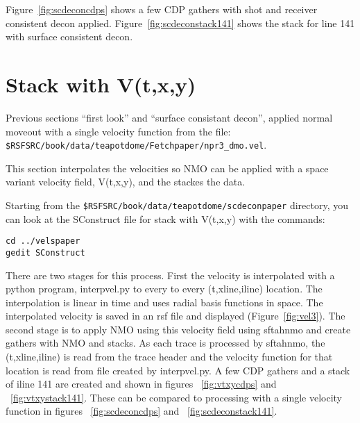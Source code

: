 Figure~\ref{fig:scdeconcdps} shows a few CDP gathers with shot and receiver consistent decon applied.  Figure~\ref{fig:scdeconstack141} shows the stack for line 141 with surface consistent decon.



\section{Stack with V(t,x,y)}

Previous sections ``first look'' and  ``surface consistant decon'', applied normal moveout  with a single velocity function from the file:
\texttt{\$RSFSRC/book/data/teapotdome/Fetchpaper/npr3\_dmo.vel}.

This section interpolates the velocities so NMO can be applied with a space variant velocity field, V(t,x,y), and the stackes the data.

Starting from the \texttt{\$RSFSRC/book/data/teapotdome/scdeconpaper} directory, you can look at the SConstruct file for stack with V(t,x,y) with the commands:
\begin{verbatim}  
cd ../velspaper
gedit SConstruct
\end{verbatim}  

There are two stages for this process.  First the velocity is interpolated with a python program, interpvel.py to every to every (t,xline,iline) location.  The interpolation is linear in time and uses radial basis functions in space.  The interpolated velocity is saved in an rsf file and displayed (Figure~\ref{fig:vel3}). The second stage is to apply NMO using this velocity field using sftahnmo and create gathers with NMO and stacks.  As each trace is processed by sftahnmo, the (t,xline,iline) is read from the trace header and the velocity function for that location is read from file created by interpvel.py.  A few CDP gathers and a stack of iline 141 are created and shown in figures ~\ref{fig:vtxycdps} and ~\ref{fig:vtxystack141}.  These can be compared to processing with a single velocity function in figures ~\ref{fig:scdeconcdps} and ~\ref{fig:scdeconstack141}.


